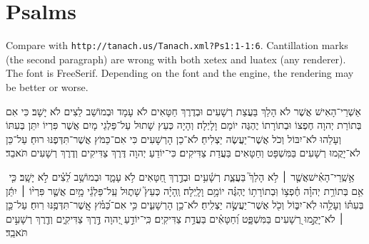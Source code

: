 \documentclass{article}
\begin{document}
\section{Psalms}


Compare with \texttt{http://tanach.us/Tanach.xml?Ps1:1-1:6}.
Cantillation marks (the second paragraph) are wrong with both
\textsf{xetex} and \textsf{luatex} (any renderer). The font is
FreeSerif. Depending on the font and the engine, the rendering may be
better or worse.

\bigskip


אַשְׁרֵי־הָאִישׁ אֲשֶׁר לֹא הָלַךְ בַּעֲצַת רְשָׁעִים וּבְדֶרֶךְ
חַטָּאִים לֹא עָמָד וּבְמוֹשַׁב לֵצִים לֹא יָשָׁב׃ כִּי אִם בְּתוֹרַת
יְהוָה חֶפְצוֹ וּבְתוֹרָתוֹ יֶהְגֶּה יוֹמָם וָלָיְלָה׃ וְהָיָה כְּעֵץ
שָׁתוּל עַל־פַּלְגֵי מָיִם אֲשֶׁר פִּרְיוֹ יִתֵּן בְּעִתּוֹ וְעָלֵהוּ
לֹא־יִבּוֹל וְכֹל אֲשֶׁר־יַעֲשֶׂה יַצְלִיחַ׃ לֹא־כֵן הָרְשָׁעִים כִּי
אִם־כַּמֹּץ אֲשֶׁר־תִּדְּפֶנּוּ רוּחַ׃ עַל־כֵּן לֹא־יָקֻמוּ רְשָׁעִים
בַּמִּשְׁפָּט וְחַטָּאִים בַּעֲדַת צַדִּיקִים׃ כִּי־יוֹדֵעַ יְהוָה
דֶּרֶךְ צַדִּיקִים וְדֶרֶךְ רְשָׁעִים תֹּאבֵד׃

אַ֥שְֽׁרֵי־הָאִ֗ישׁ‪ אֲשֶׁ֤ר ׀ לֹ֥א הָלַךְ֮ בַּעֲצַ֪ת רְשָׁ֫עִ֥ים
וּבְדֶ֣רֶךְ חַ֭טָּאִים לֹ֥א עָמָ֑ד וּבְמוֹשַׁ֥ב לֵ֝צִ֗ים לֹ֣א יָשָֽׁב׃
כִּ֤י אִ֥ם בְּתוֹרַ֥ת יְהוָ֗ה חֶ֫פְצ֥וֹ וּֽבְתוֹרָת֥וֹ יֶהְגֶּ֗ה
יוֹמָ֥ם וָלָֽיְלָה׃ וְֽהָיָ֗ה כְּעֵץ֮ שָׁת֪וּל עַֽל־פַּלְגֵ֫י מָ֥יִם
אֲשֶׁ֤ר פִּרְי֨וֹ ׀ יִתֵּ֬ן בְּעִתּ֗וֹ וְעָלֵ֥הוּ לֹֽא־יִבּ֑וֹל וְכֹ֖ל
אֲשֶׁר־יַעֲשֶׂ֣ה יַצְלִֽיחַ׃ לֹא־כֵ֥ן הָרְשָׁעִ֑ים כִּ֥י אִם־כַּ֝מֹּ֗ץ
אֲ‍ֽשֶׁר־תִּדְּפֶ֥נּוּ רֽוּחַ׃ עַל־כֵּ֤ן ׀ לֹא־יָקֻ֣מוּ רְ֭שָׁעִים
בַּמִּשְׁפָּ֑ט וְ֝חַטָּאִ֗ים בַּעֲדַ֥ת צַדִּיקִֽים׃ כִּֽי־יוֹדֵ֣עַ
יְ֭הוָה דֶּ֣רֶךְ צַדִּיקִ֑ים וְדֶ֖רֶךְ רְשָׁעִ֣ים תֹּאבֵֽד׃
\end{document}

